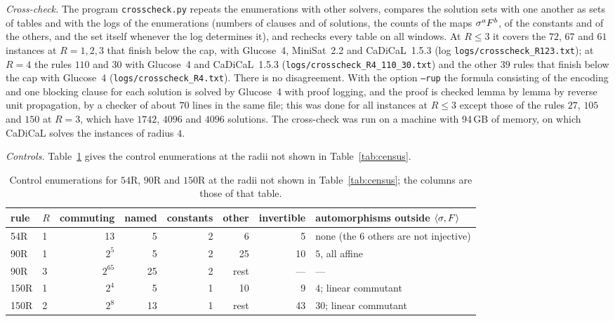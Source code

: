 \emph{Cross-check.} The program \texttt{crosscheck.py} repeats the enumerations with other solvers, compares the solution sets with one another as sets of tables and with the logs of the enumerations (numbers of clauses and of solutions, the counts of the maps $\sigma^aF^b$, of the constants and of the others, and the set itself whenever the log determines it), and rechecks every table on all windows. At $R\le3$ it covers the $72$, $67$ and $61$ instances at $R=1,2,3$ that finish below the cap, with Glucose~4, MiniSat~2.2 and CaDiCaL~1.5.3 (log \texttt{logs/crosscheck\_R123.txt}); at $R=4$ the rules $110$ and $30$ with Glucose~4 and CaDiCaL~1.5.3 (\texttt{logs/crosscheck\_R4\_110\_30.txt}) and the other $39$ rules that finish below the cap with Glucose~4 (\texttt{logs/crosscheck\_R4.txt}). There is no disagreement. With the option \texttt{--rup} the formula consisting of the encoding and one blocking clause for each solution is solved by Glucose~4 with proof logging, and the proof is checked lemma by lemma by reverse unit propagation, by a checker of about $70$ lines in the same file; this was done for all instances at $R\le3$ except those of the rules $27$, $105$ and $150$ at $R=3$, which have $1742$, $4096$ and $4096$ solutions. The cross-check was run on a machine with 94\,GB of memory, on which CaDiCaL solves the instances of radius $4$.

\emph{Controls.} Table~\ref{tab:controls} gives the control enumerations at the radii not shown in Table~\ref{tab:census}.

\begin{table}[ht]
\caption{Control enumerations for $54$R, $90$R and $150$R at the radii not shown in Table~\ref{tab:census}; the columns are those of that table.}
\label{tab:controls}
\centering\small
\begin{tabular}{llrrrrrl}
\toprule
rule & $R$ & commuting & named & constants & other & invertible & automorphisms outside $\langle\sigma,F\rangle$\\
\midrule
54R & 1 & 13 & 5 & 2 & 6 & 5 & none (the $6$ others are not injective)\\
90R & 1 & $2^{5}$ & 5 & 2 & 25 & 10 & $5$, all affine\\
90R & 3 & $2^{65}$ & 25 & 2 & rest & --- & ---\\
150R & 1 & $2^{4}$ & 5 & 1 & 10 & 9 & $4$; linear commutant\\
150R & 2 & $2^{8}$ & 13 & 1 & rest & 43 & $30$; linear commutant\\
\bottomrule
\end{tabular}
\end{table}

